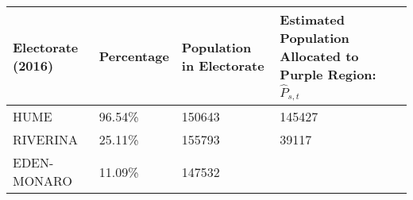 \documentclass[openany]{book}
\begin{document}
\begin{longtable}[]{@{}llll@{}}
\toprule
\begin{minipage}[b]{0.17\columnwidth}\raggedright
Electorate (2016)\strut
\end{minipage} & \begin{minipage}[b]{0.10\columnwidth}\raggedright
Percentage\strut
\end{minipage} & \begin{minipage}[b]{0.22\columnwidth}\raggedright
Population in Electorate\strut
\end{minipage} & \begin{minipage}[b]{0.40\columnwidth}\raggedright
Estimated Population Allocated to Purple Region: \(\hat{P}_{s,t}\)\strut
\end{minipage}\tabularnewline
\midrule
\endhead
\begin{minipage}[t]{0.17\columnwidth}\raggedright
HUME\strut
\end{minipage} & \begin{minipage}[t]{0.10\columnwidth}\raggedright
96.54\%\strut
\end{minipage} & \begin{minipage}[t]{0.22\columnwidth}\raggedright
150643\strut
\end{minipage} & \begin{minipage}[t]{0.40\columnwidth}\raggedright
145427\strut
\end{minipage}\tabularnewline
\begin{minipage}[t]{0.17\columnwidth}\raggedright
RIVERINA\strut
\end{minipage} & \begin{minipage}[t]{0.10\columnwidth}\raggedright
25.11\%\strut
\end{minipage} & \begin{minipage}[t]{0.22\columnwidth}\raggedright
155793\strut
\end{minipage} & \begin{minipage}[t]{0.40\columnwidth}\raggedright
39117\strut
\end{minipage}\tabularnewline
\begin{minipage}[t]{0.17\columnwidth}\raggedright
EDEN-MONARO\strut
\end{minipage} & \begin{minipage}[t]{0.10\columnwidth}\raggedright
11.09\%\strut
\end{minipage} & \begin{minipage}[t]{0.22\columnwidth}\raggedright
147532\strut
\end{minipage} & \begin{minipage}[t]{0.40\columnwidth}\raggedright

\end{minipage}
\end{longtable}
\end{document}
